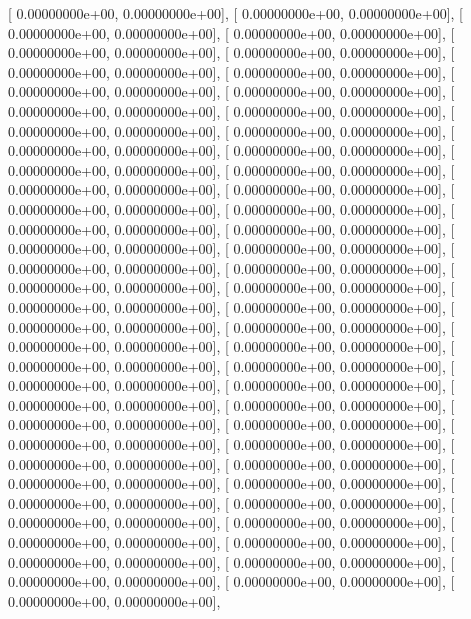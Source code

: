 \documentclass{article}
\begin{document}
       [ 0.00000000e+00,  0.00000000e+00],
       [ 0.00000000e+00,  0.00000000e+00],
       [ 0.00000000e+00,  0.00000000e+00],
       [ 0.00000000e+00,  0.00000000e+00],
       [ 0.00000000e+00,  0.00000000e+00],
       [ 0.00000000e+00,  0.00000000e+00],
       [ 0.00000000e+00,  0.00000000e+00],
       [ 0.00000000e+00,  0.00000000e+00],
       [ 0.00000000e+00,  0.00000000e+00],
       [ 0.00000000e+00,  0.00000000e+00],
       [ 0.00000000e+00,  0.00000000e+00],
       [ 0.00000000e+00,  0.00000000e+00],
       [ 0.00000000e+00,  0.00000000e+00],
       [ 0.00000000e+00,  0.00000000e+00],
       [ 0.00000000e+00,  0.00000000e+00],
       [ 0.00000000e+00,  0.00000000e+00],
       [ 0.00000000e+00,  0.00000000e+00],
       [ 0.00000000e+00,  0.00000000e+00],
       [ 0.00000000e+00,  0.00000000e+00],
       [ 0.00000000e+00,  0.00000000e+00],
       [ 0.00000000e+00,  0.00000000e+00],
       [ 0.00000000e+00,  0.00000000e+00],
       [ 0.00000000e+00,  0.00000000e+00],
       [ 0.00000000e+00,  0.00000000e+00],
       [ 0.00000000e+00,  0.00000000e+00],
       [ 0.00000000e+00,  0.00000000e+00],
       [ 0.00000000e+00,  0.00000000e+00],
       [ 0.00000000e+00,  0.00000000e+00],
       [ 0.00000000e+00,  0.00000000e+00],
       [ 0.00000000e+00,  0.00000000e+00],
       [ 0.00000000e+00,  0.00000000e+00],
       [ 0.00000000e+00,  0.00000000e+00],
       [ 0.00000000e+00,  0.00000000e+00],
       [ 0.00000000e+00,  0.00000000e+00],
       [ 0.00000000e+00,  0.00000000e+00],
       [ 0.00000000e+00,  0.00000000e+00],
       [ 0.00000000e+00,  0.00000000e+00],
       [ 0.00000000e+00,  0.00000000e+00],
       [ 0.00000000e+00,  0.00000000e+00],
       [ 0.00000000e+00,  0.00000000e+00],
       [ 0.00000000e+00,  0.00000000e+00],
       [ 0.00000000e+00,  0.00000000e+00],
       [ 0.00000000e+00,  0.00000000e+00],
       [ 0.00000000e+00,  0.00000000e+00],
       [ 0.00000000e+00,  0.00000000e+00],
       [ 0.00000000e+00,  0.00000000e+00],
       [ 0.00000000e+00,  0.00000000e+00],
       [ 0.00000000e+00,  0.00000000e+00],
       [ 0.00000000e+00,  0.00000000e+00],
       [ 0.00000000e+00,  0.00000000e+00],
       [ 0.00000000e+00,  0.00000000e+00],
       [ 0.00000000e+00,  0.00000000e+00],
       [ 0.00000000e+00,  0.00000000e+00],
       [ 0.00000000e+00,  0.00000000e+00],
       [ 0.00000000e+00,  0.00000000e+00],
       [ 0.00000000e+00,  0.00000000e+00],
       [ 0.00000000e+00,  0.00000000e+00],
       [ 0.00000000e+00,  0.00000000e+00],
       [ 0.00000000e+00,  0.00000000e+00],
       [ 0.00000000e+00,  0.00000000e+00],
       [ 0.00000000e+00,  0.00000000e+00],
\end{document}
